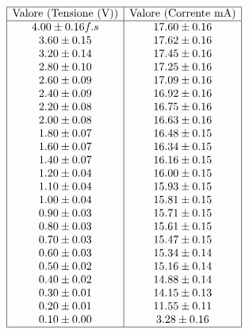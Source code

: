 \documentclass[a4paper,11pt]{article}
\begin{document}
\begin{minipage}{0.4\textwidth}
        \[
\begin{array}{|c|c|}
\hline
\text{Valore (Tensione (V))} & \text{Valore (Corrente mA)} \\ \hline
4.00 \pm 0.16 f.s  & 17.60 \pm 0.16 \\ 
3.60 \pm 0.15 & 17.62 \pm 0.16 \\ 
3.20 \pm 0.14 & 17.45 \pm 0.16 \\ 
2.80 \pm 0.10 & 17.25 \pm 0.16 \\ 
2.60 \pm 0.09 & 17.09 \pm 0.16 \\ 
2.40 \pm 0.09 & 16.92 \pm 0.16 \\ 
2.20 \pm 0.08 & 16.75 \pm 0.16 \\ 
2.00 \pm 0.08 & 16.63 \pm 0.16 \\ 
1.80 \pm 0.07 & 16.48 \pm 0.15 \\ 
1.60 \pm 0.07 & 16.34 \pm 0.15 \\ 
1.40 \pm 0.07 & 16.16 \pm 0.15 \\ 
1.20 \pm 0.04 & 16.00 \pm 0.15 \\ 
1.10 \pm 0.04 & 15.93 \pm 0.15 \\ 
1.00 \pm 0.04 & 15.81 \pm 0.15 \\ 
0.90 \pm 0.03 & 15.71 \pm 0.15 \\ 
0.80 \pm 0.03 & 15.61 \pm 0.15 \\ 
0.70 \pm 0.03 & 15.47 \pm 0.15 \\ 
0.60 \pm 0.03 & 15.34 \pm 0.14 \\ 
0.50 \pm 0.02 & 15.16 \pm 0.14 \\ 
0.40 \pm 0.02 & 14.88 \pm 0.14 \\ 
0.30 \pm 0.01 & 14.15 \pm 0.13 \\ 
0.20 \pm 0.01 & 11.55 \pm 0.11 \\ 
0.10 \pm 0.00 & 3.28 \pm 0.16 \\ \hline
\end{array}
\]
    \end{minipage}
    \hfill
\end{document}
